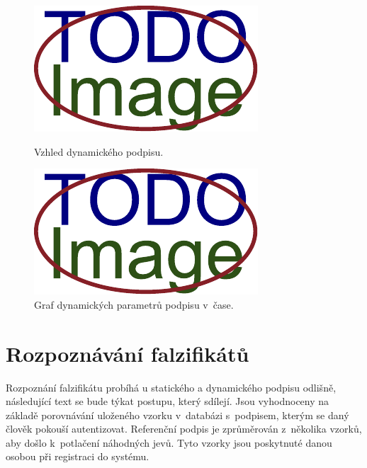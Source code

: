 \begin{figure}[h]
\centering
\begin{minipage}{0.45\textwidth}
    \centering
    \includegraphics[width=\textwidth]{obrazky-figures/placeholder.pdf}
    \caption{Vzhled dynamického podpisu.}
    \label{fig:first-image}
\end{minipage}\hfill
\begin{minipage}{0.45\textwidth}
    \centering
    \includegraphics[width=\textwidth]{obrazky-figures/placeholder.pdf}
    \caption{Graf dynamických parametrů podpisu v~čase.}
    \label{fig:second-image}
\end{minipage}
\end{figure}

\section{Rozpoznávání falzifikátů}
Rozpoznání falzifikátu probíhá u statického a dynamického podpisu odlišně, následující text se bude týkat postupu, který sdílejí.
Jsou vyhodnoceny na základě porovnávání uloženého vzorku v~databázi s~podpisem, kterým se daný člověk pokouší autentizovat.
Referenční podpis je zprůměrován z~několika vzorků, aby došlo k~potlačení náhodných jevů. %
Tyto vzorky jsou poskytnuté danou osobou při registraci do systému.

